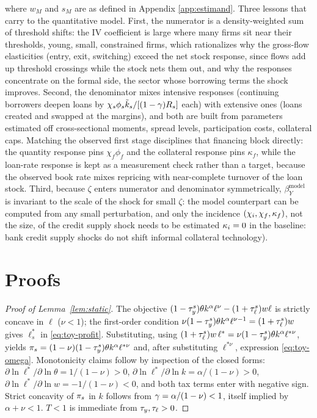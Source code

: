 \documentclass[12pt]{article}
\begin{document}
where $w_M$ and $s_M$ are as defined in Appendix \ref{app:estimand}. Three lessons that carry to the quantitative model. First, the numerator is a density-weighted sum of threshold shifts: the IV coefficient is large where many firms sit near their thresholds, young, small, constrained firms, which rationalizes why the gross-flow elasticities (entry, exit, switching) exceed the net stock response, since flows add up threshold crossings while the stock nets them out, and why the responses concentrate on the formal side, the sector whose borrowing terms the shock improves. Second, the denominator mixes intensive responses (continuing borrowers deepen loans by $\chi_{s}\phi_{s}\tilde k_{s}/[(1-\gamma)R_{s}]$ each) with extensive ones (loans created and swapped at the margins), and both are built from parameters estimated off cross-sectional moments, spread levels, participation costs, collateral caps. Matching the observed first stage disciplines that financing block directly: the quantity response pins $\chi_{f}\phi_{f}$ and the collateral response pins $\kappa_{f}$, while the loan-rate response is kept as a measurement check rather than a target, because the observed book rate mixes repricing with near-complete turnover of the loan stock. Third, because $\zeta$ enters numerator and denominator symmetrically, $\beta^{\text{model}}_{Y}$ is invariant to the scale of the shock for small $\zeta$: the model counterpart can be computed from any small perturbation, and only the incidence $(\chi_{i},\chi_{f},\kappa_{f})$, not the size, of the credit supply shock needs to be estimated $\kappa_{i}=0$ in the baseline: bank credit supply shocks do not shift informal collateral technology).

\section{Proofs}
\label{app:toy-proofs}
 
\begin{proof}[Proof of Lemma~\ref{lem:static}]
The objective
$(1-\tau_{y}^{s})\theta k^{\alpha}\ell^{\nu}-(1+\tau_{\ell}^{s})w\ell$ is
strictly concave in $\ell$ ($\nu<1$); the first-order condition
$\nu(1-\tau_{y}^{s})\theta k^{\alpha}\ell^{\nu-1}=(1+\tau_{\ell}^{s})w$ gives
$\ell^{*}_{s}$ in \eqref{eq:toy-profit}. Substituting, using
$(1+\tau_{\ell}^{s})w\,\ell^{*}=\nu(1-\tau_{y}^{s})\theta k^{\alpha}
\ell^{*\nu}$, yields
$\pi_{s}=(1-\nu)(1-\tau_{y}^{s})\theta k^{\alpha}\ell^{*\nu}$ and, after
substituting $\ell^{*\nu}$, expression \eqref{eq:toy-omega}. Monotonicity
claims follow by inspection of the closed forms:
$\partial\ln\ell^{*}/\partial\ln\theta=1/(1-\nu)>0$,
$\partial\ln\ell^{*}/\partial\ln k=\alpha/(1-\nu)>0$,
$\partial\ln\ell^{*}/\partial\ln w=-1/(1-\nu)<0$, and both tax terms
enter with negative sign. Strict concavity of $\pi_{s}$ in $k$ follows
from $\gamma=\alpha/(1-\nu)<1$, itself implied by $\alpha+\nu<1$.
$T<1$ is immediate from $\tau_{y},\tau_{\ell}>0$.
\end{proof}
 
\end{document}
